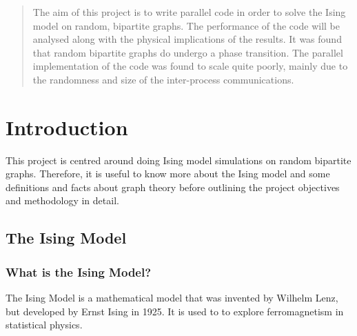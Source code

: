 \documentclass[pdftex,12pt,a4paper]{article}
\begin{document}
\vspace*{\fill}
\renewcommand{\abstractname}{Abstract}
\begin{abstract}

The aim of this project is to write parallel code in order to solve the Ising model on random, bipartite graphs. The performance of the code will be analysed along with the physical implications of the results. It was found that random bipartite graphs do undergo a phase transition. The parallel implementation of the code was found to scale quite poorly, mainly due to the randomness and size of the inter-process communications.

\end{abstract}
\vspace*{\fill}

\newpage


\tableofcontents

\newpage
{}



\section{Introduction}

This project is centred around doing Ising model simulations on random bipartite graphs. Therefore, it is useful to know more about the Ising model and some definitions and facts about graph theory before outlining the project objectives and methodology in detail.


\subsection{The Ising Model}



\subsubsection{What is the Ising Model?}

The Ising Model is a mathematical model that was invented by Wilhelm Lenz, but developed by Ernst Ising in 1925. It is used to to explore ferromagnetism in statistical physics.
\end{document}
